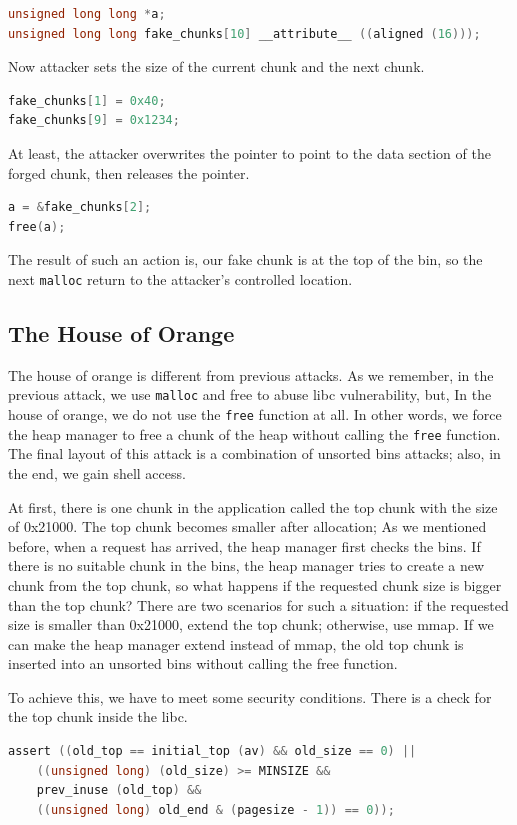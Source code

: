 \documentclass{masterthesis}
\newcommand*\ub{unsorted bins}
\newcommand*\mallocc{\lstinline{malloc}}
\begin{document}
\begin{lstlisting}[language=c,frame=tlrb]
unsigned long long *a;
unsigned long long fake_chunks[10] __attribute__ ((aligned (16)));
\end{lstlisting}

Now attacker sets the size of the current chunk and the next chunk.

\begin{lstlisting}[language=c,frame=tlrb]
fake_chunks[1] = 0x40;
fake_chunks[9] = 0x1234;
\end{lstlisting}

At least, the attacker overwrites the pointer to point to the data section of the forged chunk, then releases the pointer.

\begin{lstlisting}[language=c,frame=tlrb]
a = &fake_chunks[2];
free(a);
\end{lstlisting}

The result of such an action is, our fake chunk is at the top of the bin, so the next \mallocc{} return to the attacker's controlled location.

\subsection{The House of Orange}
The house of orange is different from previous attacks. As we remember, in the previous attack, we use \mallocc{} and free to abuse libc vulnerability, but, In the house of orange, we do not use the \lstinline{free} function at all. In other words, we force the heap manager to free a chunk of the heap without calling the \lstinline{free} function. The final layout of this attack is a combination of \ub{} attacks; also, in the end, we gain shell access.

At first, there is one chunk in the application called the top chunk with the size of 0x21000. The top chunk becomes smaller after allocation; As we mentioned before, when a request has arrived, the heap manager first checks the bins. If there is no suitable chunk in the bins, the heap manager tries to create a new chunk from the top chunk, so what happens if the requested chunk size is bigger than the top chunk? There are two scenarios for such a situation: if the requested size is smaller than 0x21000, extend the top chunk; otherwise, use mmap. If we can make the heap manager extend instead of mmap, the old top chunk is inserted into an \ub{} without calling the free function.

To achieve this, we have to meet some security conditions. There is a check for the top chunk inside the libc.
\begin{lstlisting}[language=c,frame=tlrb]
 assert ((old_top == initial_top (av) && old_size == 0) ||
	((unsigned long) (old_size) >= MINSIZE &&
	prev_inuse (old_top) &&
	((unsigned long) old_end & (pagesize - 1)) == 0));
\end{lstlisting}
\end{document}
